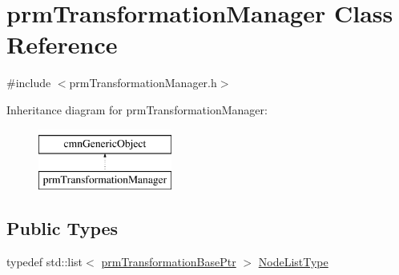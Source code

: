 \hypertarget{classprm_transformation_manager}{}\section{prm\+Transformation\+Manager Class Reference}
\label{classprm_transformation_manager}


{\ttfamily \#include $<$prm\+Transformation\+Manager.\+h$>$}

Inheritance diagram for prm\+Transformation\+Manager\+:\begin{figure}[H]
\begin{center}
\leavevmode
\includegraphics[height=2.000000cm]{d9/d5b/classprm_transformation_manager}
\end{center}
\end{figure}
\subsection*{Public Types}
\begin{DoxyCompactItemize}
\item 
typedef std\+::list$<$ \hyperlink{prm_transformation_base_8h_a881a6a7d2191474974cdf36d79e1df08}{prm\+Transformation\+Base\+Ptr} $>$ \hyperlink{classprm_transformation_manager_a7aaa30d4612656c91c80fc8ee8b96518}{Node\+List\+Type}
\end{DoxyCompactItemize}
